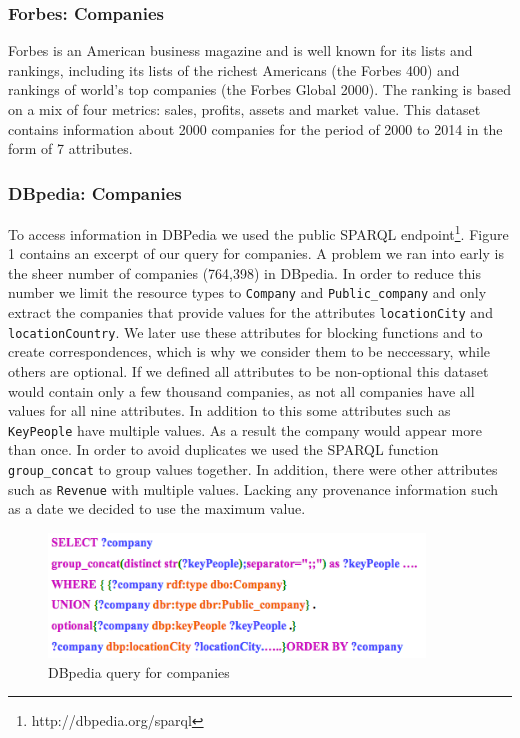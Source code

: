 \subsubsection{Forbes: Companies}
Forbes is an American business magazine and is well known for its lists and rankings, including its lists of the richest Americans (the Forbes 400) and rankings of world's top companies (the Forbes Global 2000). The ranking is based on a mix of four metrics: sales, profits, assets and market value. This dataset contains information about 2000 companies for the period of 2000 to 2014 in the form of 7 attributes.

\subsubsection{DBpedia: Companies}
To access information in DBPedia we used the public SPARQL endpoint\footnote{http://dbpedia.org/sparql}. Figure 1 contains an excerpt of our query for companies. A problem we ran into early is the sheer number of companies (764,398) in DBpedia.
In order to reduce this number we limit the resource types to \texttt{Company} and \texttt{Public\_company} and only extract the companies that provide values for the attributes \texttt{locationCity} and \texttt{locationCountry}. We later use these attributes for blocking functions and to create correspondences, which is why we consider them to be neccessary, while others are optional. If we defined all attributes to be non-optional this dataset would contain only a few thousand companies, as not all companies have all values for all nine attributes. In addition to this some attributes such as \texttt{KeyPeople} have multiple values. As a result the company would appear more than once. In order to avoid duplicates we used the SPARQL function \texttt{group\_concat} to group values together. In addition, there were other attributes such as \texttt{Revenue} with multiple values. Lacking any provenance information such as a date we decided to use the maximum value.
 
\begin{figure}[H]
	\begin{center}
	\includegraphics[width=10cm]{DB_Com}
	\caption[DBpedia query for companies]{DBpedia query for companies}
	\label{fig:db}
	\end{center}
\end{figure}

